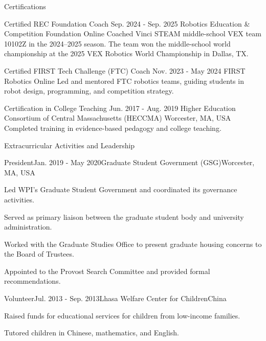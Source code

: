 \documentclass{resume} %
\begin{document}
\begin{rSection}{Certifications}

\begin{hSubsection}
{Certified REC Foundation Coach}
{Sep. 2024 - Sep. 2025}
{Robotics Education \& Competition Foundation}
{Online}
{Coached Vinci STEAM middle-school VEX team 10102Z in the 2024--2025 season. The team won the middle-school world championship at the 2025 VEX Robotics World Championship in Dallas, TX.}
\end{hSubsection}

\begin{hSubsection}
{Certified FIRST Tech Challenge (FTC) Coach}
{Nov. 2023 - May 2024}
{FIRST Robotics}
{Online}
{Led and mentored FTC robotics teams, guiding students in robot design, programming, and competition strategy.}
\end{hSubsection}

\begin{hSubsection}
{Certification in College Teaching}
{Jun. 2017 - Aug. 2019}
{Higher Education Consortium of Central Massachusetts (HECCMA)}
{Worcester, MA, USA}
{Completed training in evidence-based pedagogy and college teaching.}
\end{hSubsection}

\end{rSection}

\begin{rSection}{Extracurricular Activities and Leadership}

\begin{rSubsection}{President}{Jan. 2019 - May 2020}{Graduate Student Government (GSG)}{Worcester, MA, USA}
\item Led WPI's Graduate Student Government and coordinated its governance activities.
\item Served as primary liaison between the graduate student body and university administration.
\item Worked with the Graduate Studies Office to present graduate housing concerns to the Board of Trustees.
\item Appointed to the Provost Search Committee and provided formal recommendations.
\end{rSubsection}

\begin{rSubsection}{Volunteer}{Jul. 2013 - Sep. 2013}{Lhasa Welfare Center for Children}{China}
\item Raised funds for educational services for children from low-income families.
\item Tutored children in Chinese, mathematics, and English.
\end{rSubsection}

\end{rSection}
\end{document}
